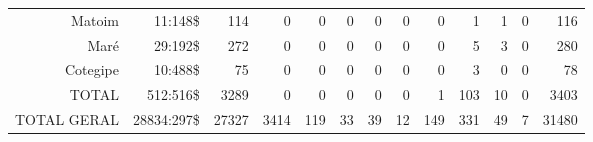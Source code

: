 \begin{landscape}
\begin{table}[!tp]
{\begin{tiny}
\begin{tabular}{rrrrrrrrrrrrr}
Matoim	&11:148\$	&114	&0	&0	&0	&0	&0	&0	&1	&1	&0	&116\\
Maré	&29:192\$	&272	&0	&0	&0	&0	&0	&0	&5	&3	&0	&280\\
Cotegipe	&10:488\$	&75	&0	&0	&0	&0	&0	&0	&3	&0	&0	&78\\
TOTAL 	&512:516\$	&3289	&0	&0	&0	&0	&0	&1	&103	&10	&0	&3403\\
\hline
TOTAL GERAL	&28834:297\$	&27327	&3414	&119	&33	&39	&12	&149	&331	&49	&7	&31480\\
\hline
\end{tabular} 
\end{tiny}
}
{}
\end{table}
\end{landscape}
